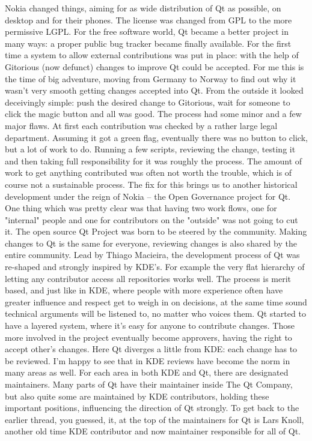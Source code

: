 Nokia changed things, aiming for as wide distribution of Qt as possible, on
desktop and for their phones. The license was changed from GPL to the more
permissive LGPL. For the free software world, Qt became a better project in many
ways: a proper public bug tracker became finally available. For the first time a
system to allow external contributions was put in place: with the help of
Gitorious (now defunct) changes to improve Qt could be accepted. For me this is
the time of big adventure, moving from Germany to Norway to find out why it
wasn't very smooth getting changes accepted into Qt. From the outside it looked
deceivingly simple: push the desired change to Gitorious, wait for someone to
click the magic button and all was good. The process had some minor and a few
major flaws. At first each contribution was checked by a rather large legal
department. Assuming it got a green flag, eventually there was no button to
click, but a lot of work to do. Running a few scripts, reviewing the change,
testing it and then taking full responsibility for it was roughly the
process. The amount of work to get anything contributed was often not worth
the trouble, which is of course not a sustainable process. The fix for this
brings us to another historical development under the reign of Nokia – the
Open Governance project for Qt. One thing which was pretty clear was that
having two work flows, one for "internal" people and one for contributors on
the "outside" was not going to cut it. The open source Qt Project was born
to be steered by the community. Making changes to Qt is the same for
everyone, reviewing changes is also shared by the entire community. Lead by
Thiago Macieira, the development process of Qt was re-shaped and strongly
inspired by KDE’s. For example the very flat hierarchy of letting any
contributor access all repositories works well. The process is merit based,
and just like in KDE, where people with more experience often have greater
influence and respect get to weigh in on decisions, at the same time sound
technical arguments will be listened to, no matter who voices them. Qt
started to have a layered system, where it’s easy for anyone to contribute
changes. Those more involved in the project eventually become approvers,
having the right to accept other’s changes. Here Qt diverges a little from
KDE: each change has to be reviewed. I'm happy to see that in KDE reviews
have become the norm in many areas as well. For each area in both KDE and
Qt, there are designated maintainers. Many parts of Qt have their maintainer
inside The Qt Company, but also quite some are maintained by KDE
contributors, holding these important positions, influencing the direction
of Qt strongly. To get back to the earlier thread, you guessed, it, at the
top of the maintainers for Qt is Lars Knoll, another old time KDE
contributor and now maintainer responsible for all of Qt.

